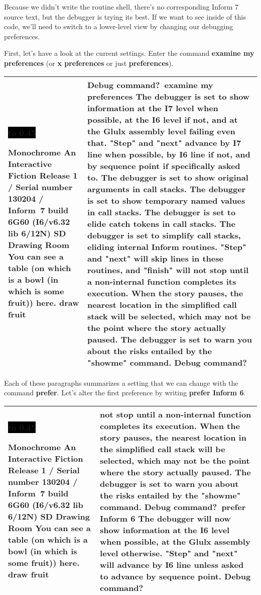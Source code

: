 \documentclass{book}
\newcommand{\n}{\hspace*{\fill}\newline}
\newcommand{\terp}[2]{\begin{center}\begin{tabular}{p{0.45\textwidth}|p{0.45\textwidth}}\midrule #1&#2\\\midrule\end{tabular}\end{center}}
\newcommand{\glkheading}[1]{\textbf{#1}}
\newcommand{\glkinput}[1]{\textbf{#1}}
\newcommand{\glkstatusline}[2]{\centerline{\colorbox{black}{\hbox to 0.45\textwidth{\textcolor{white}{#1\hfil #2}}}}}
\newcommand{\storyprompt}{\raisebox{1.5pt}{\(>\)}}
\newcommand{\cursor}{\raisebox{-1.5pt}{\RectangleThin}}
\begin{document}
Because we didn't write the routine shell, there's no corresponding Inform 7
source text, but the debugger is trying its best.  If we want to see inside of
this code, we'll need to switch to a lower-level view by changing our debugging
preferences.

First, let's have a look at the current settings.  Enter the command
\glkinput{examine my preferences} (or \glkinput{x preferences} or just
\glkinput{preferences}).

\terp{\glkstatusline{Drawing Room}{0/1}\n
  \glkheading{Monochrome}\n
  An Interactive Fiction\n
  Release 1 / Serial number 130204 / Inform~7 build 6G60 (I6/v6.32 lib 6/12N) SD\n
  \n
  \glkheading{Drawing Room}\n
  You can see a table (on which is a bowl (in which is some fruit)) here.\n
  \n
  \storyprompt\glkinput{draw fruit}}{%
  Debug command?\ \glkinput{examine my preferences}\n
  \n
  The debugger is set to show information at the I7 level when possible, at the I6 level if not, and at the Glulx assembly level failing even that.  "Step" and "next" advance by I7 line when possible, by I6 line if not, and by sequence point if specifically asked to.\n
  The debugger is set to show original arguments in call stacks.\n
  The debugger is set to show temporary named values in call stacks.\n
  The debugger is set to elide catch tokens in call stacks.\n
  The debugger is set to simplify call stacks, eliding internal Inform routines.  "Step" and "next" will skip lines in these routines, and "finish" will not stop until a non-internal function completes its execution.  When the story pauses, the nearest location in the simplified call stack will be selected, which may not be the point where the story actually paused.\n
  The debugger is set to warn you about the risks entailed by the "showme" command.\n
  \n
  Debug command?\ \cursor}

Each of these paragraphs summarizes a setting that we can change with the
command \glkinput{prefer}.  Let's alter the first preference by writing
\glkinput{prefer Inform 6}.

\terp{\glkstatusline{Drawing Room}{0/1}\n
  \glkheading{Monochrome}\n
  An Interactive Fiction\n
  Release 1 / Serial number 130204 / Inform~7 build 6G60 (I6/v6.32 lib 6/12N) SD\n
  \n
  \glkheading{Drawing Room}\n
  You can see a table (on which is a bowl (in which is some fruit)) here.\n
  \n
  \storyprompt\glkinput{draw fruit}}{%
  not stop until a non-internal function completes its execution.  When the story pauses, the nearest location in the simplified call stack will be selected, which may not be the point where the story actually paused.\n
  The debugger is set to warn you about the risks entailed by the "showme" command.\n
  \n
  Debug command?\ \glkinput{prefer Inform 6}\n
  \n
  The debugger will now show information at the I6 level when possible, at the Glulx assembly level otherwise.  "Step" and "next" will advance by I6 line unless asked to advance by sequence point.\n
  \n
  Debug command?\ \cursor}
\end{document}
